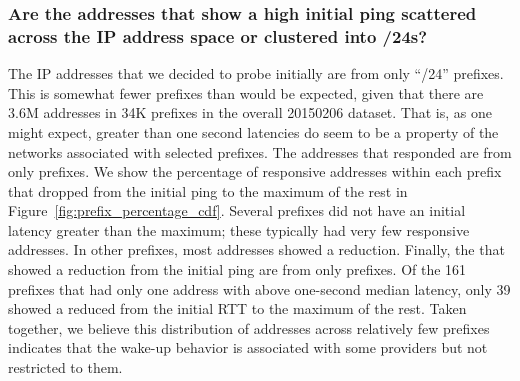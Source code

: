 \subsubsection*{Are the addresses that show a high initial
ping scattered across the IP address space or clustered into
/24s?}  The \countInitialList{} IP addresses that we decided
to probe initially are from only
\countInitialSlashTwentyFours{} ``/24'' prefixes.  This is
somewhat fewer prefixes than would be expected, given that
there are 3.6M addresses in 34K prefixes in the overall
20150206 dataset.  That is, as one might expect, greater than
one second latencies do seem to be a property of the
networks associated with selected prefixes.  The
\countResponsives{} addresses that responded are from only
\countResponsiveSlashTwentyFours{} prefixes.  We show the percentage
of responsive addresses within each prefix that dropped from the 
initial ping to the maximum of the rest in Figure~\ref{fig:prefix_percentage_cdf}.  Several
prefixes did not have an initial latency greater than the maximum; these typically had very few responsive addresses.  In other
prefixes, most addresses showed a reduction.
Finally, the
\countDropsToMedianAndToMax{} that showed a reduction from the
initial ping are from only \countDroppingSlashTwentyFours{}
prefixes.  Of the 161 prefixes that had only one address with 
above one-second median latency, only 39 showed a reduced from the
initial RTT to the maximum of the rest.  Taken together, we believe
this distribution of addresses across relatively few prefixes indicates
that the wake-up behavior is associated with some providers but not
restricted to them.

